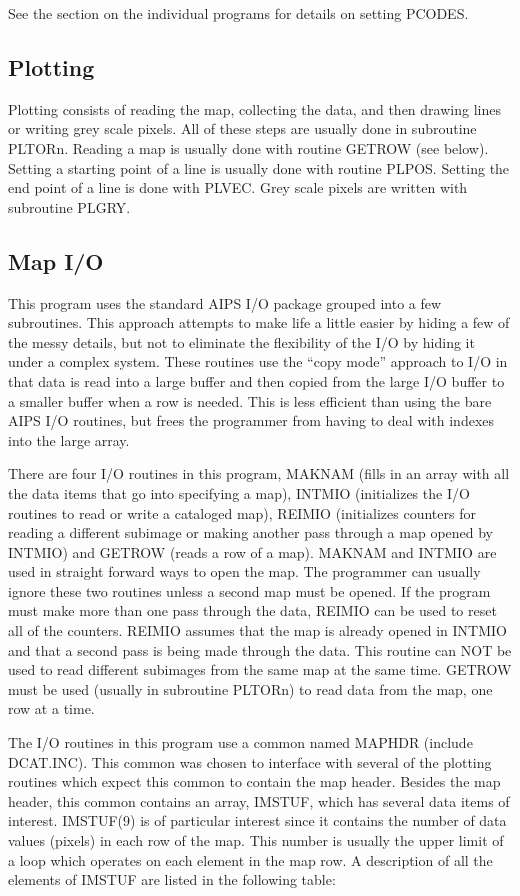 See the section on the individual programs for details on setting
PCODES.

\subsection{Plotting}
Plotting consists of reading the map, collecting the data, and then
drawing lines or writing grey scale pixels.  All of these steps are
usually done in subroutine PLTORn.  Reading a map is usually done with
routine GETROW (see below).  Setting a starting point of a line is
usually done with routine PLPOS.  Setting the end point of a line is
done with PLVEC.  Grey scale pixels are written with subroutine PLGRY.

\subsection{Map I/O}
This program uses the standard AIPS I/O package grouped into a few subroutines.
This approach attempts to make life a little easier by hiding a few of
the messy details, but not to eliminate the flexibility of the
I/O by hiding it under a complex system.  These routines use
the ``copy mode'' approach to I/O in that data is read into a large
buffer and then copied from the large I/O buffer to a
smaller buffer when a row is needed.  This is less efficient than
using the bare AIPS I/O routines, but frees the programmer from having
to deal with indexes into the large array.


There are four I/O routines in this program, MAKNAM (fills in an
array with all the data items that go into specifying a map), INTMIO
(initializes the I/O routines to read or write a cataloged map),
REIMIO (initializes counters for reading a different subimage or
making another pass through a map opened by INTMIO) and GETROW (reads
a row of a map).  MAKNAM and INTMIO are used in straight forward ways to
open the map.  The programmer can usually ignore these two routines
unless a second map must be opened.  If the program must make more
than one pass through the data, REIMIO can be used to reset all of the
counters.  REIMIO assumes that the map is already opened in INTMIO and
that a second pass is being made through the data.  This routine can
NOT be used to read different subimages from the same map at the same
time.  GETROW must be used (usually in subroutine PLTORn) to read data
from the map, one row at a time.

The I/O routines in this program use a common named MAPHDR (include
DCAT.INC).  This common was chosen to interface with several of the
plotting routines which expect this common to contain the map header.
Besides the map header, this common contains an array, IMSTUF, which
has several data items of interest.  IMSTUF(9) is of particular
interest since it contains the number of data values (pixels) in each
row of the map.  This number is usually the upper limit of a loop
which operates on each element in the map row.  A description of all
the elements of IMSTUF are listed in the following table:

